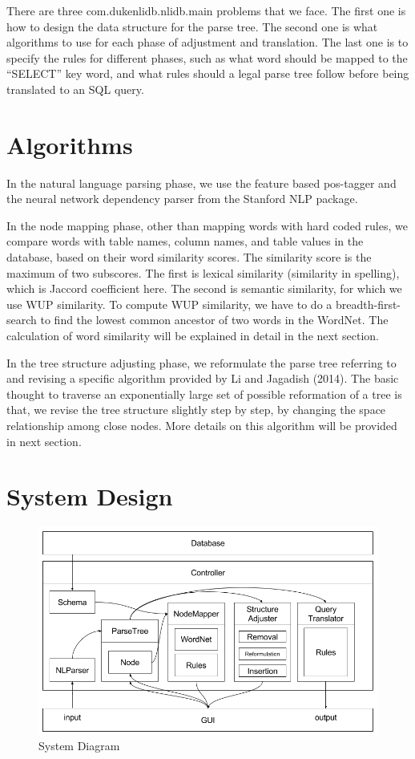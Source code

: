 \documentclass[twocolumn]{article}
\begin{document}
There are three com.dukenlidb.nlidb.main problems that we face. The first one is how to design the data structure for the parse tree. The second one is what algorithms to use for each phase of adjustment and translation. The last one is to specify the rules for different phases, such as what word should be mapped to the ``SELECT'' key word, and what rules should a legal parse tree follow before being translated to an SQL query.

\section{Algorithms}

In the natural language parsing phase, we use the feature based pos-tagger\cite{toutanova2003feature} and the neural network dependency parser\cite{chen2014fast} from the Stanford NLP package.

In the node mapping phase, other than mapping words with hard coded rules, we compare words with table names, column names, and table values in the database, based on their word similarity scores. The similarity score is the maximum of two subscores. The first is lexical similarity (similarity in spelling), which is Jaccord coefficient here. The second is semantic similarity, for which we use WUP similarity\cite{wu1994verbs}. To compute WUP similarity, we have to do a breadth-first-search to find the lowest common ancestor of two words in the WordNet. The calculation of word similarity will be explained in detail in the next section.

In the tree structure adjusting phase, we reformulate the parse tree referring to and revising a specific algorithm provided by Li and Jagadish (2014)\cite{li2014}. The basic thought to traverse an exponentially large set of possible reformation of a tree is that, we revise the tree structure slightly step by step, by changing the space relationship among close nodes. More details on this algorithm will be provided in next section.

\section{System Design}

\begin{figure}[ht]
  \centering
  \includegraphics[width=0.8\linewidth]{figures/nlidb_system_diagram.png}
  \caption{System Diagram}
\end{figure}
\end{document}
